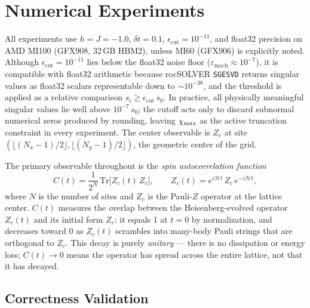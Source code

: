 \section{Numerical Experiments}
\label{sec:experiments}

All experiments use $h = J = -1.0$, $\delta t = 0.1$,
$\epsilon_{\mathrm{cut}} = 10^{-11}$, and float32 precision on AMD MI100
(GFX908, 32\,GB HBM2), unless MI60 (GFX906) is explicitly noted.
Although $\epsilon_{\mathrm{cut}} = 10^{-11}$ lies below the float32 noise
floor ($\varepsilon_{\mathrm{mach}} \approx 10^{-7}$), it is compatible with
float32 arithmetic because rocSOLVER \texttt{SGESVD} returns singular values
as float32 scalars representable down to $\sim10^{-38}$, and the threshold is
applied as a relative comparison $s_i \geq \epsilon_{\mathrm{cut}}\,s_0$.
In practice, all physically meaningful singular values lie well above
$10^{-7}\,s_0$; the cutoff acts only to discard subnormal numerical zeros
produced by rounding, leaving $\chi_{\mathrm{max}}$ as the active truncation constraint
in every experiment.
The center observable is $Z_c$ at site $(\lfloor(N_x-1)/2\rfloor,\lfloor(N_y-1)/2\rfloor)$,
the geometric center of the grid.

The primary observable throughout is the \emph{spin autocorrelation function}
\begin{equation}
  C(t) = \frac{1}{2^N}\,\mathrm{Tr}\bigl[Z_c(t)\,Z_c\bigr],
  \qquad
  Z_c(t) = e^{i\mathcal{H}t}\,Z_c\,e^{-i\mathcal{H}t},
  \label{eq:ct_def}
\end{equation}
where $N$ is the number of sites and $Z_c$ is the Pauli-$Z$ operator at the
lattice center.
$C(t)$ measures the overlap between the Heisenberg-evolved operator $Z_c(t)$
and its initial form $Z_c$: it equals 1 at $t=0$ by normalization, and
decreases toward 0 as $Z_c(t)$ scrambles into many-body Pauli strings
that are orthogonal to $Z_c$.
This decay is purely \emph{unitary} --- there is no dissipation or energy loss;
$C(t) \to 0$ means the operator has spread across the entire lattice,
not that it has decayed.

\subsection{Correctness Validation}
\label{sec:correctness}

